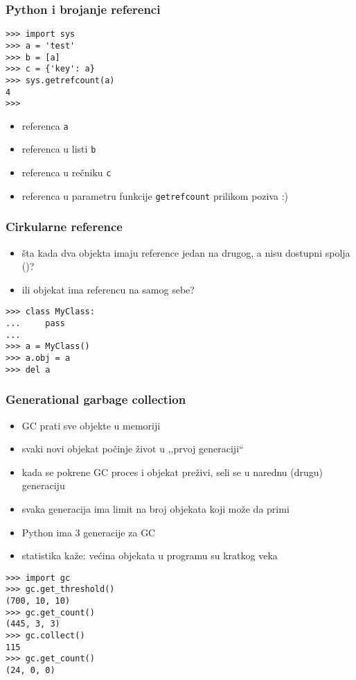 \documentclass[compress,aspectratio=169]{beamer}
\begin{document}
\begin{frame}
  \frametitle{Python i brojanje referenci}
\begin{verbatim}
>>> import sys
>>> a = 'test'
>>> b = [a]
>>> c = {'key': a}
>>> sys.getrefcount(a)
4
>>> 
\end{verbatim}
\begin{itemize}
  \item referenca \texttt{a}
  \item referenca u listi \texttt{b}
  \item referenca u rečniku \texttt{c}
  \item referenca u parametru funkcije \texttt{getrefcount} prilikom poziva :)
\end{itemize}
\end{frame}

\begin{frame}[fragile]
  \frametitle{Cirkularne reference}
  \begin{itemize}
    \item šta kada dva objekta imaju reference jedan na drugog, a
      nisu dostupni spolja ()?
    \item ili objekat ima referencu na samog sebe?
  \end{itemize}
\begin{verbatim}
>>> class MyClass:
...     pass
...
>>> a = MyClass()
>>> a.obj = a
>>> del a
\end{verbatim}
\end{frame}

\begin{frame}
  \frametitle{Generational garbage collection}
  \begin{itemize}
    \item GC prati sve objekte u memoriji
    \item svaki novi objekat počinje život u ,,prvoj generaciji``
    \item kada se pokrene GC proces i objekat preživi, seli se u
      narednu (drugu) generaciju
    \item svaka generacija ima limit na broj objekata koji može da primi
    \item Python ima 3 generacije za GC
    \item statistika kaže: većina objekata u programu su kratkog veka
  \end{itemize}
\begin{verbatim}
>>> import gc
>>> gc.get_threshold()
(700, 10, 10)
>>> gc.get_count()
(445, 3, 3)
>>> gc.collect()
115
>>> gc.get_count()
(24, 0, 0)
\end{verbatim}
\end{frame}
\end{document}
